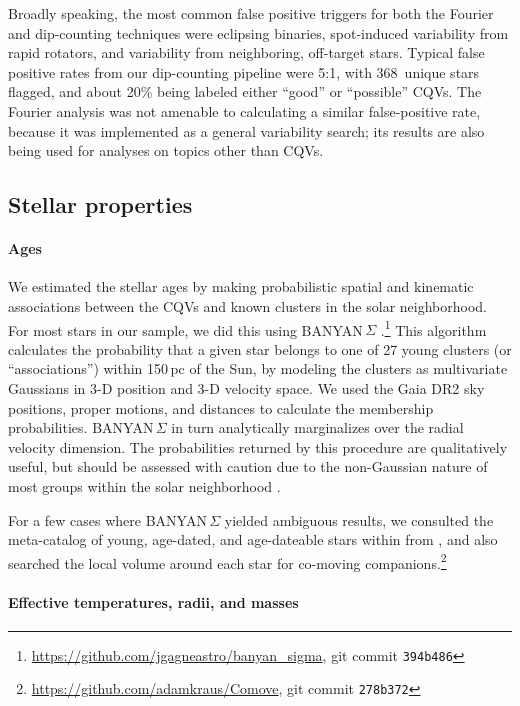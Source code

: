 \documentclass[11pt,twocolumn,tighten]{aastex63}
\newcommand{\nuniqdipflagged}{{368}} %
\begin{document}
Broadly speaking, the most common false positive triggers for both the Fourier
and dip-counting techniques were eclipsing binaries, spot-induced
variability from rapid rotators, and variability from neighboring,
off-target stars.  Typical false positive rates from our dip-counting
pipeline were 5:1, with \nuniqdipflagged\ unique stars flagged, and
about 20\% being labeled either ``good'' or ``possible'' CQVs.  The
Fourier analysis was not amenable to calculating a similar
false-positive rate, because it was implemented as a general
variability search; its results are also being used for analyses on
topics other than CQVs.


\subsection{Stellar properties}
\label{subsec:starprops}

\paragraph{Ages}
We estimated the stellar ages by making probabilistic spatial and
kinematic associations between the CQVs and known clusters in the
solar neighborhood.  For most stars in our sample, we did this using
BANYAN\,$\Sigma$
\citep{2018ApJ...856...23G}.\footnote{\url{https://github.com/jgagneastro/banyan_sigma},
git commit \texttt{394b486}} This algorithm calculates the probability
that a given star belongs to one of 27 young clusters (or
``associations'') within 150\,pc of the Sun, by modeling the clusters
as multivariate Gaussians in 3-D position and 3-D velocity space.  We
used the Gaia DR2 sky positions, proper motions, and distances to
calculate the membership probabilities.  BANYAN\,$\Sigma$ in turn
analytically marginalizes over the radial velocity dimension.  The
probabilities returned by this procedure are qualitatively useful, but
should be assessed with caution due to the non-Gaussian nature of most
groups within the solar neighborhood \citep[see
e.g.][Figure~10]{2021ApJ...917...23K}.

For a few cases where BANYAN\,$\Sigma$ yielded ambiguous results, we
consulted the meta-catalog of young, age-dated, and age-dateable stars
within from \citet{2022AJ....163..121B}, and also searched the local
volume around each star for co-moving
companions.\footnote{\url{https://github.com/adamkraus/Comove}, git
commit \texttt{278b372}}


\paragraph{Effective temperatures, radii, and masses}
\end{document}
